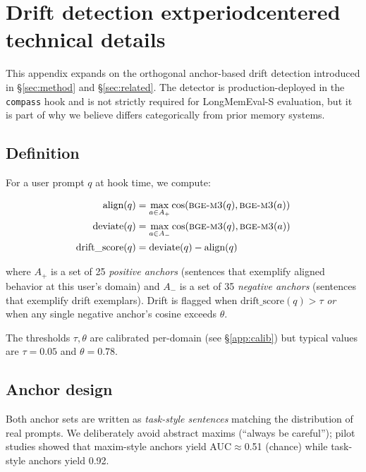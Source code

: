 
\appendix

\section{Drift detection 	extperiodcentered{}  technical details}
\label{app:drift}

This appendix expands on the orthogonal anchor-based drift detection
introduced in §\ref{sec:method} and §\ref{sec:related}. The detector is
production-deployed in the \texttt{compass} hook and is not strictly
required for LongMemEval-S evaluation, but it is part of why we believe
\compass{} differs categorically from prior memory systems.

\subsection{Definition}

For a user prompt $q$ at hook time, we compute:

\begin{align}
\text{align}(q) &= \max_{a \in A_+} \cos(\textsc{bge-m3}(q), \textsc{bge-m3}(a)) \\
\text{deviate}(q) &= \max_{a \in A_-} \cos(\textsc{bge-m3}(q), \textsc{bge-m3}(a)) \\
\text{drift\_score}(q) &= \text{deviate}(q) - \text{align}(q)
\end{align}

where $A_+$ is a set of 25 \emph{positive anchors} (sentences that
exemplify aligned behavior at this user's domain) and $A_-$ is a set of
35 \emph{negative anchors} (sentences that exemplify drift exemplars).
Drift is flagged when $\text{drift\_score}(q) > \tau$ \emph{or} when any
single negative anchor's cosine exceeds $\theta$.

The thresholds $\tau, \theta$ are calibrated per-domain (see
§\ref{app:calib}) but typical values are $\tau = 0.05$ and $\theta = 0.78$.

\subsection{Anchor design}

Both anchor sets are written as \emph{task-style sentences} matching the
distribution of real prompts. We deliberately avoid abstract maxims
(``always be careful''); pilot studies showed that maxim-style anchors
yield AUC$\approx$0.51 (chance) while task-style anchors yield 0.92.

